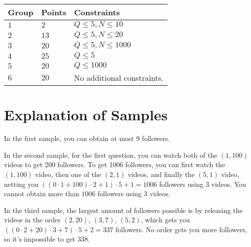 \noindent
\begin{tabular}{| l | l | p{12cm} |}
  \hline
  \textbf{Group} & \textbf{Points} & \textbf{Constraints} \\ \hline
  $1$    & $2$        & $Q \leq 5, N \leq 10$ \\ \hline
  $2$    & $13$       & $Q \leq 5, N \leq 20$ \\ \hline
  $3$    & $20$       & $Q \leq 5, N \leq 1000$ \\ \hline
  $4$    & $25$       & $Q \leq 5$ \\ \hline
  $5$    & $20$       & $Q \leq 1000$ \\ \hline
  $6$    & $20$       & No additional constraints. \\ \hline
\end{tabular}

\section*{Explanation of Samples}
In the first sample, you can obtain at most 9 followers.

In the second sample, for the first question, you can watch both of the $(1,100)$ videos to get 200 followers.
To get 1006 followers, you can first watch the $(1,100)$ video, then one of the $(2,1)$ videos, and finally the $(5,1)$ video,
netting you $((0 \cdot 1 + 100) \cdot 2 + 1) \cdot 5 + 1= 1006$ followers using 3 videos. You cannot obtain more than $1006$
followers using 3 videos.

In the third sample, the largest amount of followers possible is by releasing the videos in the order
$(2,20)$, $(3,7)$, $(5,2)$, which gets you $((0 \cdot 2 + 20) \cdot 3 + 7) \cdot 5 + 2=337$ followers.
No order gets you more followers, so it's impossible to get $338$.
